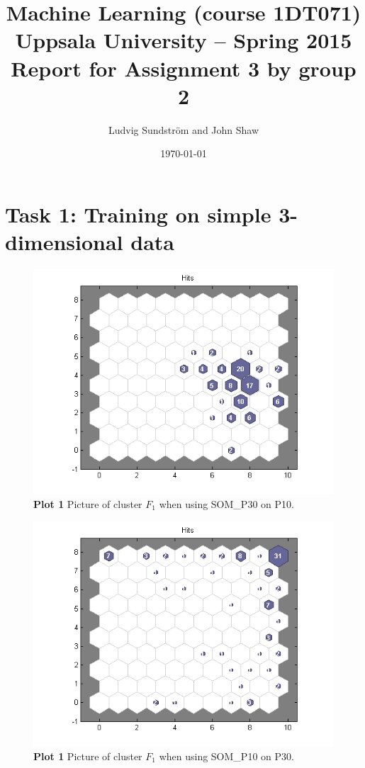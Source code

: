 \documentclass[a4paper]{article}
\title{Machine Learning (course 1DT071)
Uppsala University – Spring 2015
Report for Assignment 3 by group 2}
\author{Ludvig Sundstr\"{o}m and John Shaw}
\date{\today}
\begin{document}
\maketitle

\section*{Task 1: Training on simple 3-dimensional data}

\begin{figure}[H] %
	\includegraphics[]{q1_somP30onP10.png}
	\caption{\label{fig:q1_somP30onP10}\textbf{Plot 1} Picture of cluster $F_1$ when using SOM\_P30 on P10.}
\end{figure}

\begin{figure}[H] %
	\includegraphics[]{q1_somP10onP30.png}
	\caption{\label{fig:q1_somP10onP30}\textbf{Plot 1} Picture of cluster $F_1$ when using SOM\_P10 on P30.}
\end{figure}
\end{document}
